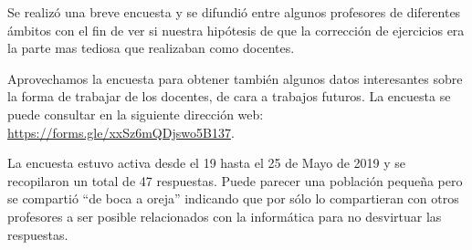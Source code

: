 Se realizó una breve encuesta y se difundió entre algunos profesores de diferentes ámbitos con el fin de ver si nuestra hipótesis de que la corrección de ejercicios era la parte mas tediosa que realizaban como docentes.

\bigskip
Aprovechamos la encuesta para obtener también algunos datos interesantes sobre la forma de trabajar de los docentes, de cara a trabajos futuros. La encuesta se puede consultar en la siguiente dirección web: \url{https://forms.gle/xxSz6mQDjswo5B137}.

\bigskip
La encuesta estuvo activa desde el 19 hasta el 25 de Mayo de 2019 y se recopilaron un total de 47 respuestas. Puede parecer una población pequeña pero se compartió ``de boca a oreja'' indicando que por sólo lo compartieran con otros profesores a ser posible relacionados con la informática para no desvirtuar las respuestas.


